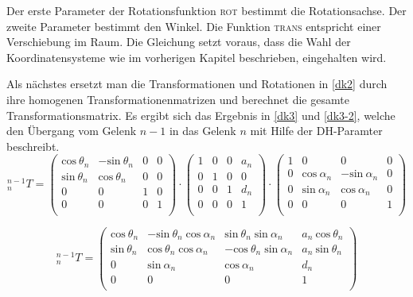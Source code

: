 Der erste Parameter der Rotationsfunktion \textsc{rot} bestimmt die Rotationsachse. Der zweite Parameter bestimmt den Winkel. Die Funktion \textsc{trans} entspricht einer Verschiebung im Raum. Die Gleichung setzt voraus, dass die Wahl der Koordinatensysteme wie im vorherigen Kapitel beschrieben, eingehalten wird.

Als nächstes ersetzt man die Transformationen und Rotationen in \autoref{dk2} durch ihre homogenen Transformationenmatrizen und berechnet die gesamte Transformationsmatrix. Es ergibt sich das Ergebnis in \autoref{dk3} und \ref{dk3-2}, welche den Übergang vom Gelenk $n - 1$ in das Gelenk $n$ mit Hilfe der DH-Paramter beschreibt.
\begin{equation}
  ^{n-1}_{n}T = \begin{pmatrix}
    \textrm{cos}\: \theta_n & -\textrm{sin}\: \theta_n  & 0 & 0\\ 
    \textrm{sin}\: \theta_n & \textrm{cos}\: \theta_n   & 0 & 0\\ 
    0             & 0               & 1 & 0\\ 
    0             & 0               & 0 & 1\\
\end{pmatrix} \cdot
\begin{pmatrix}
  1 & 0 & 0 & a_n\\ 
  0 & 1 & 0 & 0\\ 
  0 & 0 & 1 & d_n\\ 
  0 & 0 & 0 & 1\\
\end{pmatrix} \cdot \begin{pmatrix}
  1 & 0 & 0 & 0\\ 
  0 & \textrm{cos}\: \alpha_n & -\textrm{sin}\: \alpha_n & 0\\ 
  0 & \textrm{sin}\: \alpha_n & \textrm{cos}\: \alpha_n & 0\\ 
  0 & 0 & 0 & 1\\
\end{pmatrix}
\label{dk3}
\end{equation}

\begin{equation}
^{n-1}_{n}T = \begin{pmatrix}
  \textrm{cos}\: \theta_n  & -\textrm{sin}\: \theta_n\; \textrm{cos}\: \alpha_n    & \textrm{sin}\: \theta_n\; \textrm{sin}\: \alpha_n & a_n\: \textrm{cos}\: \theta_n\\ 
  \textrm{sin}\: \theta_n  & \textrm{cos}\: \theta_n\; \textrm{cos}\: \alpha_n     & -\textrm{cos}\: \theta_n\; \textrm{sin}\: \alpha_n & a_n\: \textrm{sin}\: \theta_n\\ 
  0               & \textrm{sin}\: \alpha_n                & \textrm{cos}\: \alpha_n & d_n\\ 
  0               & 0                             & 0 & 1\\
\end{pmatrix}
\label{dk3-2}
\end{equation}

